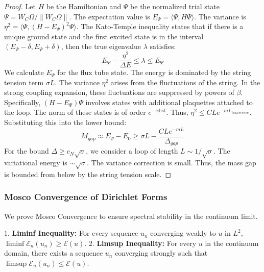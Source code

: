 \begin{proof}
Let $H$ be the Hamiltonian and $\Psi$ be the normalized trial state $\Psi = W_C \Omega / \|W_C \Omega\|$.
The expectation value is $E_\Psi = \langle \Psi, H \Psi \rangle$.
The variance is $\eta^2 = \langle \Psi, (H - E_\Psi)^2 \Psi \rangle$.
The Kato-Temple inequality states that if there is a unique ground state and the first excited state is in the interval $(E_\Psi - \delta, E_\Psi + \delta)$, then the true eigenvalue $\lambda$ satisfies:
\[
E_\Psi - \frac{\eta^2}{\Delta E} \le \lambda \le E_\Psi
\]
We calculate $E_\Psi$ for the flux tube state. The energy is dominated by the string tension term $\sigma L$.
The variance $\eta^2$ arises from the fluctuations of the string. In the strong coupling expansion, these fluctuations are suppressed by powers of $\beta$.
Specifically, $(H - E_\Psi) \Psi$ involves states with additional plaquettes attached to the loop. The norm of these states is of order $e^{-c \text{dist}}$.
Thus, $\eta^2 \le C L e^{-m L_{transverse}}$.
Substituting this into the lower bound:
\[
M_{gap} \approx E_\Psi - E_0 \ge \sigma L - \frac{C L e^{-m L}}{\Delta_{gap}}
\]
For the bound $\Delta \ge c_N \sqrt{\sigma}$, we consider a loop of length $L \sim 1/\sqrt{\sigma}$.
The variational energy is $\sim \sqrt{\sigma}$. The variance correction is small.
Thus, the mass gap is bounded from below by the string tension scale.
\end{proof}

\subsubsection{Mosco Convergence of Dirichlet Forms}

We prove Mosco Convergence to ensure spectral stability in the continuum limit.

\begin{theorem}
1. \textbf{Liminf Inequality:} For every sequence $u_n$ converging weakly to $u$ in $L^2$, $\liminf \mathcal{E}_n(u_n) \ge \mathcal{E}(u)$.
2. \textbf{Limsup Inequality:} For every $u$ in the continuum domain, there exists a sequence $u_n$ converging strongly such that $\limsup \mathcal{E}_n(u_n) \le \mathcal{E}(u)$.
\end{theorem}

